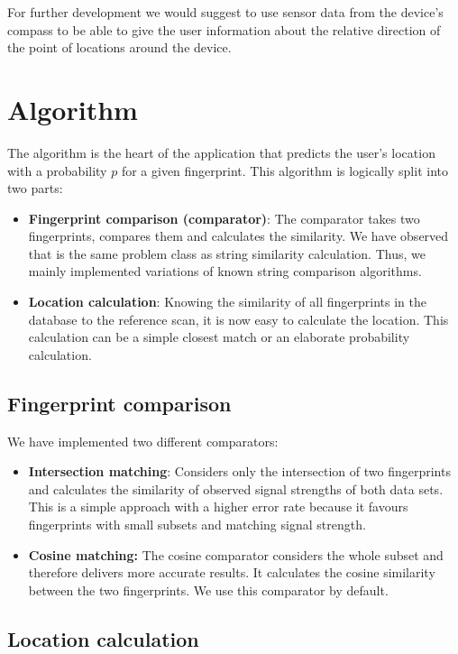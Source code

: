 \documentclass{article}
\begin{document}
For further development we would suggest to use sensor data from the device's compass to be able to give the user information about the relative direction of the point of locations around the device.

\section{Algorithm}

The algorithm is the heart of the application that predicts the user's location with a probability $p$ for a given fingerprint. This algorithm is logically split into two parts:

\begin{itemize}
  \item \textbf{Fingerprint comparison (comparator)}: The comparator takes two fingerprints, compares them and calculates the similarity. We have observed that is the same problem class as string similarity calculation. Thus, we mainly implemented variations of known string comparison algorithms.
  \item \textbf{Location calculation}: Knowing the similarity of all fingerprints in the database to the reference scan, it is now easy to calculate the location. This calculation can be a simple closest match or an elaborate probability calculation.
\end{itemize}

\subsection{Fingerprint comparison}

We have implemented two different comparators:

\begin{itemize}
  \item \textbf{Intersection matching}: Considers only the intersection of two fingerprints and calculates the similarity of observed signal strengths of both data sets. This is a simple approach with a higher error rate because it favours fingerprints with small subsets and matching signal strength.
  \item \textbf{Cosine matching:} The cosine comparator considers the whole subset and therefore delivers more accurate results. It calculates the cosine similarity between the two fingerprints. We use this comparator by default.
\end{itemize}

\subsection{Location calculation}
\end{document}
